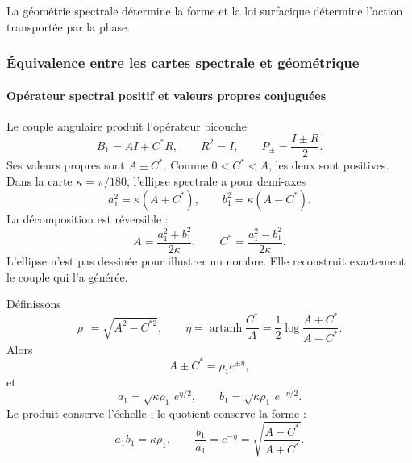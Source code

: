 \noindent La géométrie spectrale détermine la forme et la loi surfacique détermine l'action transportée par la phase.\par\medskip

\subsubsection{Équivalence entre les cartes spectrale et géométrique}

\paragraph{Opérateur spectral positif et valeurs propres conjuguées}

Le couple angulaire produit l'opérateur bicouche
\begin{equation}
B_1=AI+C^*R,\qquad R^2=I,\qquad
P_\pm=\frac{I\pm R}{2}.
\label{eq:B1}
\end{equation}
Ses valeurs propres sont \(A\pm C^*\). Comme \(0<C^*<A\), les deux sont positives.
Dans la carte \(\kappa=\pi/180\), l'ellipse spectrale a pour demi-axes
\begin{equation}
a_1^2=\kappa(A+C^*),\qquad
b_1^2=\kappa(A-C^*).
\label{eq:semiejes-espectrales}
\end{equation}
La décomposition est réversible :
\begin{equation}
A=\frac{a_1^2+b_1^2}{2\kappa},\qquad
C^*=\frac{a_1^2-b_1^2}{2\kappa}.
\label{eq:reconstruccion-AC}
\end{equation}
L'ellipse n'est pas dessinée pour illustrer un nombre. Elle reconstruit exactement le
couple qui l'a générée.

Définissons
\begin{equation}
\rho_1=\sqrt{A^2-C^{*2}},\qquad
\eta=\operatorname{artanh}\frac{C^*}{A}
=\frac12\log\frac{A+C^*}{A-C^*}.
\label{eq:eta}
\end{equation}
Alors
\[
A\pm C^*=\rho_1e^{\pm\eta},
\]
et
\begin{equation}
a_1=\sqrt{\kappa\rho_1}\,e^{\eta/2},
\qquad
b_1=\sqrt{\kappa\rho_1}\,e^{-\eta/2}.
\label{eq:semiejes-eta}
\end{equation}
Le produit conserve l'échelle ; le quotient conserve la forme :
\[
a_1b_1=\kappa\rho_1,
\qquad
\frac{b_1}{a_1}=e^{-\eta}
=\sqrt{\frac{A-C^*}{A+C^*}}.
\]

